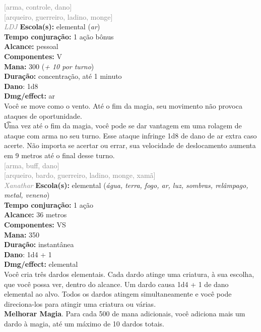 \documentclass{RPG_Adventure}[2021/10/20]
\begin{document}
{\scriptsize \textcolor{gray}{[arma, controle, dano]\\}}
{\scriptsize \textcolor{gray}{[arqueiro, guerreiro, ladino, monge]\\}}
{\tiny \textcolor{gray}{\textit{LDJ}}}\jump{}
{\small \t \textbf{Escola(s):} elemental (\textit{ar})\\\t \textbf{Tempo conjuração:} 1 ação bônus\\\t \textbf{Alcance:} pessoal\\\t \textbf{Componentes:} V\\\t \textbf{Mana:} 300 (\textit{+ 10 por turno})\\\t \textbf{Duração:} concentração, até 1 minuto\\\t \textbf{Dano}: 1d8\\\t \textbf{Dmg/effect:} ar\\}
{\normalsize Você se move como o vento. Até o fim da magia, seu movimento não provoca ataques de oportunidade.\\\t Uma vez até o fim da magia, você pode se dar vantagem em uma rolagem de ataque com arma no seu turno. Esse ataque infringe 1d8 de dano de ar extra caso acerte. Não importa se acertar ou errar, sua velocidade de deslocamento aumenta em 9 metros até o final desse turno.\\}
{\scriptsize \textcolor{gray}{[arma, buff, dano]\\}}
{\scriptsize \textcolor{gray}{[arqueiro, bardo, guerreiro, ladino, monge, xamã]\\}}
{\tiny \textcolor{gray}{\textit{Xanathar}}}\jump{}
{\small \t \textbf{Escola(s):} elemental (\textit{água, terra, fogo, ar, luz, sombras, relâmpago, metal, veneno})\\\t \textbf{Tempo conjuração:} 1 ação\\\t \textbf{Alcance:} 36 metros\\\t \textbf{Componentes:} VS\\\t \textbf{Mana:} 350\\\t \textbf{Duração:} instantânea\\\t \textbf{Dano}: 1d4 + 1\\\t \textbf{Dmg/effect:} elemental\\}
{\normalsize Você cria três dardos elementais. Cada dardo atinge uma criatura, à sua escolha, que você possa ver, dentro do alcance. Um dardo causa 1d4 + 1 de dano elemental ao alvo. Todos os dardos atingem simultaneamente e você pode direciona-los para atingir uma criatura ou várias.\\\t \textbf{Melhorar Magia}. Para cada 500 de mana adicionais, você adiciona mais um dardo à magia, até um máximo de 10 dardos totais.\\}
\end{document}
